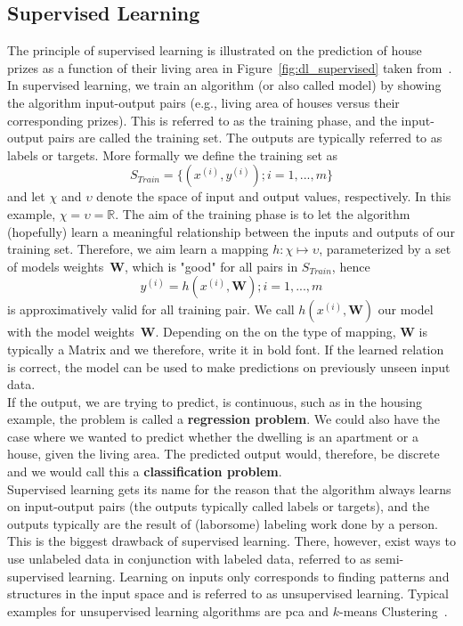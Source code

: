 \subsection{Supervised Learning} \label{sec:ml_supervised}
The principle of supervised learning is illustrated on the prediction of house prizes as a function of their living area in Figure~\ref{fig:dl_supervised} taken from~\cite{Ng2012StanfordNotes}. In supervised learning, we train an algorithm (or also called model) by showing the algorithm input-output pairs (e.g., living area of houses versus their corresponding prizes). This is referred to as the training phase, and the input-output pairs are called the training set. The outputs are typically referred to as labels or targets. More formally we define the training set as
\begin{equation}
   S_{Train} = \{(x^{(i)}, y^{(i)}); i = 1,...,m\}
   \label{eq:training_set}
\end{equation}
and let $\chi$ and $\upsilon$ denote the space of input and output values, respectively. In this example, $\chi = \upsilon = \mathbb{R}$. The aim of the training phase is to let the algorithm (hopefully) learn a meaningful relationship between the inputs and outputs of our training set. Therefore, we aim learn a mapping $h : \chi \mapsto \upsilon$, parameterized by a set of models weights~$\textbf{W}$, which is "good" for all pairs in $S_{Train}$, hence
\begin{equation}
   y^{(i)} = h(x^{(i)}, \mathbf{W}); i = 1,...,m
   \label{eq:model}
\end{equation}
is approximatively valid for all training pair. We call $h(x^{(i)}, \mathbf{W})$ our model with the model weights~$\textbf{W}$. Depending on the on the type of mapping, $\mathbf{W}$ is typically a Matrix and we therefore, write it in bold font. If the learned relation is correct, the model can be used to make predictions on previously unseen input data.\\
If the output, we are trying to predict, is continuous, such as in the housing example, the problem is called a \textbf{regression problem}. We could also have the case where we wanted to predict whether the dwelling is an apartment or a house, given the living area. The predicted output would, therefore, be discrete and we would call this a \textbf{classification problem}.\\
Supervised learning gets its name for the reason that the algorithm always learns on input-output pairs (the outputs typically called labels or targets), and the outputs typically are the result of (laborsome) labeling work done by a person. This is the biggest drawback of supervised learning. There, however, exist ways to use unlabeled data in conjunction with labeled data, referred to as semi-supervised learning. Learning on inputs only corresponds to finding patterns and structures in the input space and is referred to as unsupervised learning. Typical examples for unsupervised learning algorithms are \gls{pca} and $k$-means Clustering~\cite{Goodfellow2016DeepLearning}.\\
